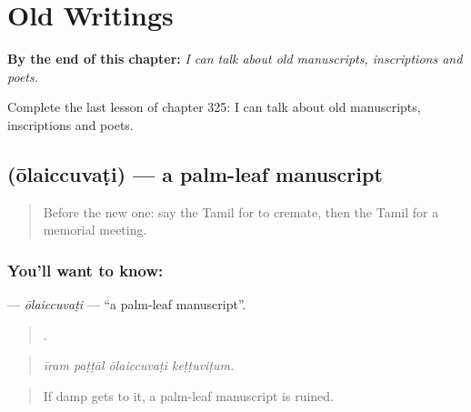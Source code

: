 
\chapter{Old Writings}
\label{ch:ta-old-writings}

\begin{chapteropening}
\textbf{By the end of this chapter:} \emph{I can talk about old manuscripts, inscriptions and poets.}

Complete the last lesson of chapter 325: I can talk about old manuscripts, inscriptions and poets.
\end{chapteropening}

\section[\texorpdfstring{\ta{ஓலைச்சுவடி} (ōlaiccuvaṭi)}{ஓலைச்சுவடி (ōlaiccuvaṭi)}]{ (ōlaiccuvaṭi) — a palm-leaf manuscript}

\label{lesson:TA-C325-olaiccuvati}



\begin{quote}
Before the new one: say the Tamil for to cremate, then the Tamil for a memorial meeting.
\end{quote}

\subsection*{You'll want to know: }
\textbf{} — \emph{ōlaiccuvaṭi} — \textquotedblleft{}a palm-leaf manuscript\textquotedblright{}.

\begin{quote}
   .
\end{quote}

\begin{quote}
\emph{īram paṭṭāl ōlaiccuvaṭi keṭṭuviṭum.}
\end{quote}

\begin{quote}
If damp gets to it, a palm-leaf manuscript is ruined.
\end{quote}

